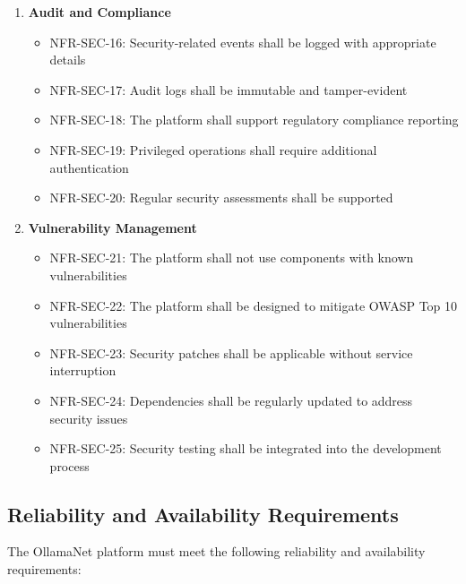 \begin{enumerate}
   \item \textbf{Audit and Compliance}
   \begin{itemize}
      \item NFR-SEC-16: Security-related events shall be logged with appropriate details
      \item NFR-SEC-17: Audit logs shall be immutable and tamper-evident
      \item NFR-SEC-18: The platform shall support regulatory compliance reporting
      \item NFR-SEC-19: Privileged operations shall require additional authentication
      \item NFR-SEC-20: Regular security assessments shall be supported
   \end{itemize}

   \item \textbf{Vulnerability Management}
   \begin{itemize}
      \item NFR-SEC-21: The platform shall not use components with known vulnerabilities
      \item NFR-SEC-22: The platform shall be designed to mitigate OWASP Top 10 vulnerabilities
      \item NFR-SEC-23: Security patches shall be applicable without service interruption
      \item NFR-SEC-24: Dependencies shall be regularly updated to address security issues
      \item NFR-SEC-25: Security testing shall be integrated into the development process
   \end{itemize}
\end{enumerate}

\subsection{Reliability and Availability Requirements}

The OllamaNet platform must meet the following reliability and availability requirements:

